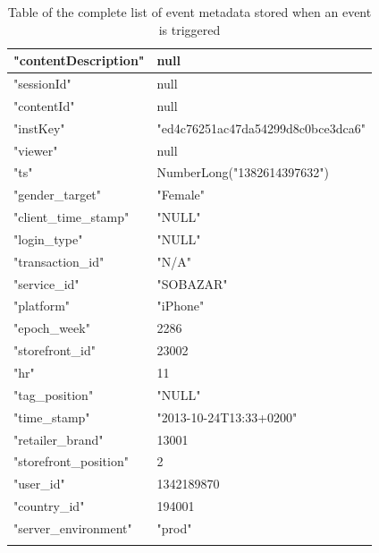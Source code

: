 \begin{table}[H]
\begin{tabular}{l|l}
            "contentDescription"    &   null     \\ \hline
            "sessionId" &   null     \\ \hline
            "contentId" &   null     \\ \hline
            "instKey"   &   "ed4c76251ac47da54299d8c0bce3dca6"   \\ \hline
            "viewer"    &   null     \\ \hline
            "ts"    &   NumberLong("1382614397632")  \\ \hline
            "gender\_target" &   "Female"     \\ \hline
            "client\_time\_stamp" &   "NULL"   \\ \hline
            "login\_type"    &   "NULL"   \\ \hline
            "transaction\_id"    &   "N/A"    \\ \hline
            "service\_id"    &   "SOBAZAR"    \\ \hline
            "platform"  &   "iPhone"     \\ \hline
            "epoch\_week"    &   2286     \\ \hline
            "storefront\_id" &   23002    \\ \hline
            "hr"    &   11   \\ \hline
            "tag\_position"  &   "NULL"   \\ \hline
            "time\_stamp"    &   "2013-10-24T13:33+0200"  \\ \hline
            "retailer\_brand"    &   13001    \\ \hline
            "storefront\_position"   &   2    \\ \hline
            "user\_id"   &   1342189870   \\ \hline
            "country\_id"    &   194001   \\ \hline
            "server\_environment"    &   "prod" \\
            \bottomrule
        \caption[Complete List of Event Metadata]{Table of the complete list of event metadata stored when an event is triggered}
        \label{table:completeEventData}
        \end{tabular}
    \end{table}

